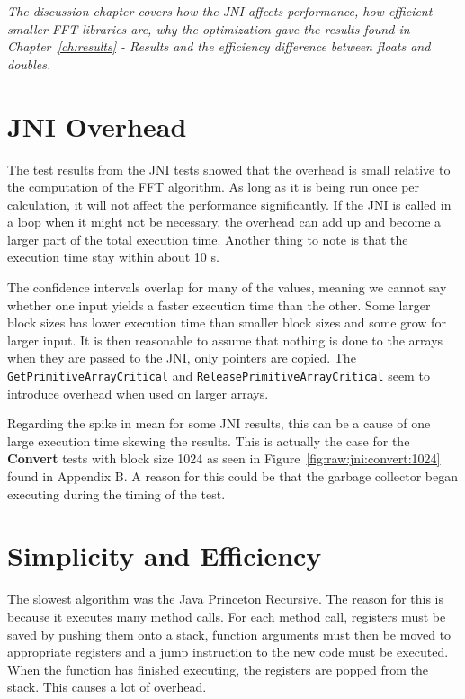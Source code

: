 \textit{The discussion chapter covers how the JNI affects performance, how efficient smaller FFT libraries are, why the optimization gave the results found in Chapter~\ref{ch:results} - Results and the efficiency difference between floats and doubles.}

\section{JNI Overhead}
The test results from the JNI tests showed that the overhead is small relative to the computation of the FFT algorithm. As long as it is being run once per calculation, it will not affect the performance significantly. If the JNI is called in a loop when it might not be necessary, the overhead can add up and become a larger part of the total execution time. Another thing to note is that the execution time stay within about 10 \textmu s.

The confidence intervals overlap for many of the values, meaning we cannot say whether one input yields a faster execution time than the other. Some larger block sizes has lower execution time than smaller block sizes and some grow for larger input. It is then reasonable to assume that nothing is done to the arrays when they are passed to the JNI, only pointers are copied. The \texttt{GetPrimitiveArrayCritical} and \texttt{ReleasePrimitiveArrayCri\-tical} seem to introduce overhead when used on larger arrays. %

Regarding the spike in mean for some JNI results, this can be a cause of one large execution time skewing the results. This is actually the case for the \textbf{Convert} tests with block size 1024 as seen in Figure~\ref{fig:raw:jni:convert:1024} found in Appendix B. A reason for this could be that the garbage collector began executing during the timing of the test.

\section{Simplicity and Efficiency}

The slowest algorithm was the Java Princeton Recursive. The reason for this is because it executes many method calls. For each method call, registers must be saved by pushing them onto a stack, function arguments must then be moved to appropriate registers and a jump instruction to the new code must be executed. When the function has finished executing, the registers are popped from the stack. This causes a lot of overhead.

